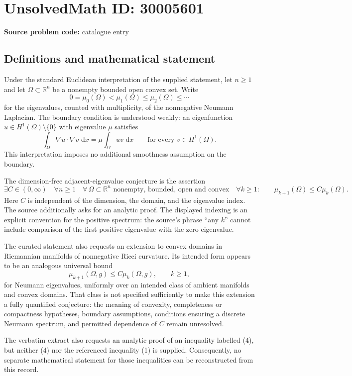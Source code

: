 \documentclass[11pt]{article}
\newcommand{\R}{\mathbb{R}}
\newcommand{\dd}{\,\mathrm{d}}
\begin{document}
\section*{UnsolvedMath ID: 30005601}
\textbf{Source problem code:} catalogue entry
\subsection{Definitions and mathematical statement}
Under the standard Euclidean interpretation of the supplied statement, let \(n\geq 1\) and let \(\Omega\subset\R^n\) be a nonempty bounded open convex set. Write
\[
0=\mu_0(\Omega)<\mu_1(\Omega)\leq\mu_2(\Omega)\leq\cdots
\]
for the eigenvalues, counted with multiplicity, of the nonnegative Neumann Laplacian. The boundary condition is understood weakly: an eigenfunction \(u\in H^1(\Omega)\setminus\{0\}\) with eigenvalue \(\mu\) satisfies
\[
\int_\Omega \nabla u\cdot\nabla v\,\dd x
=\mu\int_\Omega uv\,\dd x
\qquad\text{for every }v\in H^1(\Omega).
\]
This interpretation imposes no additional smoothness assumption on the boundary.

The dimension-free adjacent-eigenvalue conjecture is the assertion
\[
\exists C\in(0,\infty)\quad
\forall n\geq1\quad
\forall\,\Omega\subset\R^n\text{ nonempty, bounded, open and convex}\quad
\forall k\geq1:\qquad
\mu_{k+1}(\Omega)\leq C\mu_k(\Omega).
\]
Here \(C\) is independent of the dimension, the domain, and the eigenvalue index. The source additionally asks for an analytic proof. The displayed indexing is an explicit convention for the positive spectrum: the source's phrase ``any \(k\)'' cannot include comparison of the first positive eigenvalue with the zero eigenvalue.

The curated statement also requests an extension to convex domains in Riemannian manifolds of nonnegative Ricci curvature. Its intended form appears to be an analogous universal bound
\[
\mu_{k+1}(\Omega,g)\leq C\mu_k(\Omega,g),\qquad k\geq1,
\]
for Neumann eigenvalues, uniformly over an intended class of ambient manifolds and convex domains. That class is not specified sufficiently to make this extension a fully quantified conjecture: the meaning of convexity, completeness or compactness hypotheses, boundary assumptions, conditions ensuring a discrete Neumann spectrum, and permitted dependence of \(C\) remain unresolved.

The verbatim extract also requests an analytic proof of an inequality labelled (4), but neither (4) nor the referenced inequality (1) is supplied. Consequently, no separate mathematical statement for those inequalities can be reconstructed from this record.
\end{document}
